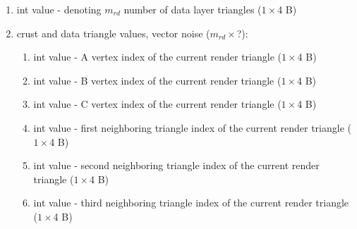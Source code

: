 \begin{enumerate}
\begin{enumerate}
\end{enumerate}
\item int value - denoting $m_{rd}$ number of data layer triangles ($1\times$4 B)
\item crust and data triangle values, vector noise ($m_{rd}\times$?):
\begin{enumerate}
\item int value - A vertex index of the current render triangle ($1\times$4 B)
\item int value - B vertex index of the current render triangle ($1\times$4 B)
\item int value - C vertex index of the current render triangle ($1\times$4 B)
\item int value - first neighboring triangle index of the current render triangle ($1\times$4 B)
\item int value - second neighboring triangle index of the current render triangle ($1\times$4 B)
\item int value - third neighboring triangle index of the current render triangle ($1\times$4 B)
\end{enumerate}
\end{enumerate}
